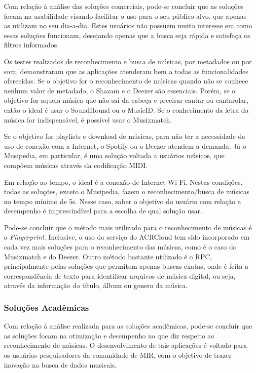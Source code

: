 Com relação à análise das soluções comerciais, pode-se concluir que as soluções focam na usabilidade visando facilitar o uso para o seu público-alvo, que apenas as utilizam no seu dia-a-dia. Estes usuários não possuem muito interesse em como essas soluções funcionam, desejando apenas que a busca seja rápida e satisfaça os filtros informados.

Os testes realizados de reconhecimento e busca de músicas, por metadados ou por som, demonstraram que as aplicações atenderam bem a todas as funcionalidades oferecidas. Se o objetivo for o reconhecimento de músicas quando não se conhece nenhum valor de metadado, o Shazam e o Deezer são essenciais. Porém, se o objetivo for aquela música que não sai da cabeça e precisar cantar ou cantarolar, então o ideal é usar o SoundHound ou o MusicID. Se o conhecimento da letra da música for indispensável, é possível usar o Musixmatch.

Se o objetivo for playlists e download de músicas, para não ter a necessidade do uso de conexão com a Internet, o Spotify ou o Deezer atendem a demanda. Já o Musipedia, em particular, é uma solução voltada a usuários músicos, que compõem músicas através da codificação MIDI.

Em relação ao tempo, o ideal é a conexão de Internet Wi-Fi. Nestas condições, todas as soluções, exceto o Musipedia, fazem o reconhecimento/busca de músicas no tempo mínimo de 5s. Nesse caso, saber o objetivo do usuário com relação a desempenho é imprescindível para a escolha de qual solução usar.

Pode-se concluir que o método mais utilizado para o reconhecimento de músicas é o \textit{Fingerprint}. Inclusive, o uso do serviço do ACRCloud tem sido incorporado em cada vez mais soluções para o reconhecimento das músicas, como é o caso do Musixmatch e do Deezer. Outro método bastante utilizado é o RPC, principalmente pelas soluções que permitem apenas buscas exatas, onde é feita a correspondência de texto para identificar arquivos de música digital, ou seja, através da informação do título, álbum ou genero da música.


\subsubsection{Soluções Acadêmicas}

Com relação à análise realizada para as soluções acadêmicas, pode-se concluir que as soluções focam na otimização e desempenho no que diz respeito ao reconhecimento de músicas. O desenvolvimento de tais aplicações é voltado para os usuários pesquisadores da comunidade de MIR, com o objetivo de trazer inovação na busca de dados musicais.

